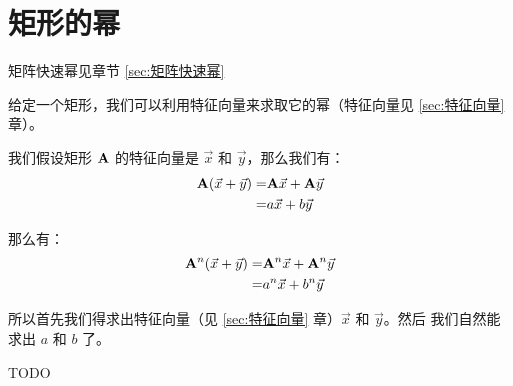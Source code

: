 \section{矩形的幂}
\label{sec:矩阵的幂}

矩阵快速幂见章节 \ref{sec:矩阵快速幂}

给定一个矩形，我们可以利用特征向量来求取它的幂（特征向量见 \ref{sec:特征向量}
章）。

我们假设矩形 $\mathbf{A}$ 的特征向量是 $\vec x$ 和 $\vec y$，那么我们有：\[
\begin{aligned}
    \mathbf{A}(\vec x + \vec y) = &{} \mathbf{A} \vec x + \mathbf{A} \vec y \\ = &{} a
    \vec x + b \vec y
\end{aligned}
\]

那么有：\[
\begin{aligned}
    \mathbf{A}^n (\vec x + \vec y) = &{} \mathbf{A}^n \vec x + \mathbf{A}^n \vec y \\
    = &{} a^n \vec x + b^n \vec y
\end{aligned}
\]

所以首先我们得求出特征向量（见 \ref{sec:特征向量} 章）$\vec x$ 和 $\vec y$。然后
我们自然能求出 $a$ 和 $b$ 了。

TODO
